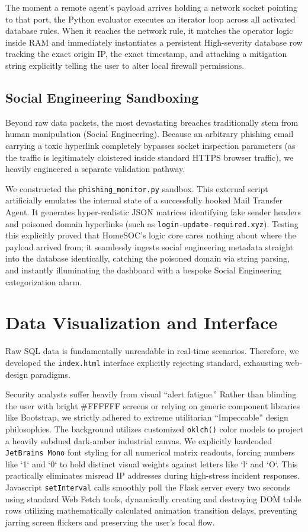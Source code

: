 \documentclass[conference]{IEEEtran}
\begin{document}
The moment a remote agent's payload arrives holding a network socket pointing to that port, the Python evaluator executes an iterator loop across all activated database rules. When it reaches the network rule, it matches the operator logic inside RAM and immediately instantiates a persistent High-severity database row tracking the exact origin IP, the exact timestamp, and attaching a mitigation string explicitly telling the user to alter local firewall permissions. 

\subsection{Social Engineering Sandboxing}
Beyond raw data packets, the most devastating breaches traditionally stem from human manipulation (Social Engineering). Because an arbitrary phishing email carrying a toxic hyperlink completely bypasses socket inspection parameters (as the traffic is legitimately cloistered inside standard HTTPS browser traffic), we heavily engineered a separate validation pathway.

We constructed the \verb|phishing_monitor.py| sandbox. This external script artificially emulates the internal state of a successfully hooked Mail Transfer Agent. It generates hyper-realistic JSON matrices identifying fake sender headers and poisoned domain hyperlinks (such as \verb|login-update-required.xyz|). Testing this explicitly proved that HomeSOC's logic core cares nothing about where the payload arrived from; it seamlessly ingests social engineering metadata straight into the database identically, catching the poisoned domain via string parsing, and instantly illuminating the dashboard with a bespoke Social Engineering categorization alarm.

\section{Data Visualization and Interface}

Raw SQL data is fundamentally unreadable in real-time scenarios. Therefore, we developed the \verb|index.html| interface explicitly rejecting standard, exhausting web-design paradigms.

Security analysts suffer heavily from visual ``alert fatigue.'' Rather than blinding the user with bright \#FFFFFF screens or relying on generic component libraries like Bootstrap, we strictly adhered to extreme utilitarian ``Impeccable'' design philosophies. 
The background utilizes customized \verb|oklch()| color models to project a heavily subdued dark-amber industrial canvas. 
We explicitly hardcoded \verb|JetBrains Mono| font styling for all numerical matrix readouts, forcing numbers like `1` and `0` to hold distinct visual weights against letters like `l` and `O`. This practically eliminates misread IP addresses during high-stress incident responses.
Javascript \verb|setInterval| calls smoothly poll the Flask server every two seconds using standard Web Fetch tools, dynamically creating and destroying DOM table rows utilizing mathematically calculated animation transition delays, preventing jarring screen flickers and preserving the user's focal flow.
\end{document}
